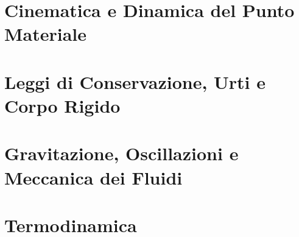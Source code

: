 \documentclass[11pt,a4paper,twoside,openright]{book}
\begin{document}
\part{Cinematica e Dinamica del Punto Materiale}





\part{Leggi di Conservazione, Urti e Corpo Rigido}





\part{Gravitazione, Oscillazioni e Meccanica dei Fluidi}




\part{Termodinamica}





\backmatter
\end{document}
